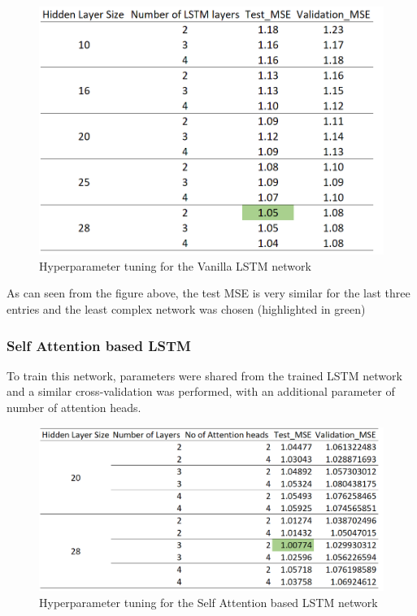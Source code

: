 \documentclass{article}
\begin{document}
\begin{figure}[H]
\centering
\includegraphics[scale=0.5]{result/res1.png}
\caption{Hyperparameter tuning for the Vanilla LSTM network}
\end{figure}

As can seen from the figure above, the test MSE is very similar for the last three entries and the least complex network was chosen (highlighted in green)
\subsubsection{Self Attention based LSTM}
To train this network, parameters were shared from the trained LSTM network and a similar cross-validation was performed, with an additional parameter of number of attention heads.
\begin{figure}[H]
\centering
\includegraphics[scale=0.5]{result/res2.png}
\caption{Hyperparameter tuning for the Self Attention based LSTM network}
\end{figure}
\end{document}
